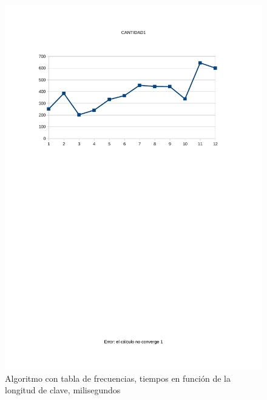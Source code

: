 \documentclass[12pt]{report}
\begin{document}
\begin{figure}
\includegraphics[width=1\textwidth]{img/guess.pdf}
\caption{Algoritmo con tabla de frecuencias, tiempos en función de la longitud de clave, milisegundos}
\label{fig:guess}
\end{figure}
\end{document}
